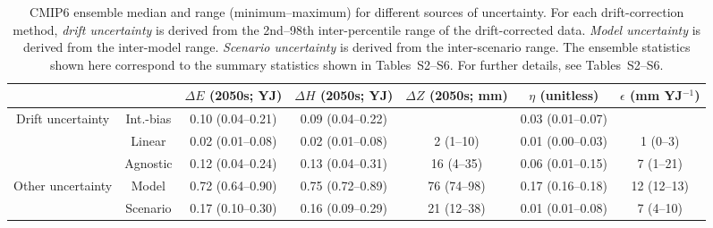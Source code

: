 \begin{table*}[t]
\centering
\caption{CMIP6 ensemble median and range (minimum–maximum) for different sources of uncertainty. For each drift-correction method, \emph{drift uncertainty} is derived from the 2nd--98th inter-percentile range of the drift-corrected data. \emph{Model uncertainty} is derived from the inter-model range. \emph{Scenario uncertainty} is derived from the inter-scenario range. The ensemble statistics shown here correspond to the summary statistics shown in Tables~S2--S6. For further details, see Tables~S2--S6.}
\begin{tabular}{cc|c|c|c|c|c}
\toprule
 &  & $\Delta E$ (2050s; YJ) & $\Delta H$ (2050s; YJ) & $\Delta Z$ (2050s; mm) & $\eta$ (unitless) & $\epsilon$ (mm YJ$^{-1}$) \\
\midrule
\multirow[c]{3}{*}{Drift uncertainty} & Int.-bias & 0.10 (0.04–0.21) & 0.09 (0.04–0.22) &  & 0.03 (0.01–0.07) &  \\
 & Linear & 0.02 (0.01–0.08) & 0.02 (0.01–0.08) & 2 (1–10) & 0.01 (0.00–0.03) & 1 (0–3) \\
 & Agnostic & 0.12 (0.04–0.24) & 0.13 (0.04–0.31) & 16 (4–35) & 0.06 (0.01–0.15) & 7 (1–21) \\
\midrule
\multirow[c]{2}{*}{Other uncertainty} & Model & 0.72 (0.64–0.90) & 0.75 (0.72–0.89) & 76 (74–98) & 0.17 (0.16–0.18) & 12 (12–13) \\
 & Scenario & 0.17 (0.10–0.30) & 0.16 (0.09–0.29) & 21 (12–38) & 0.01 (0.01–0.08) & 7 (4–10) \\
\bottomrule
\end{tabular}
\end{table*}

